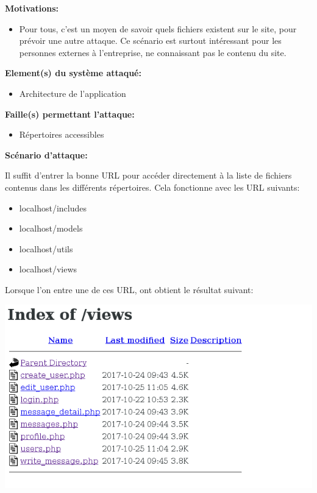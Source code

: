 \documentclass{article}
\begin{document}
\textbf{Motivations:}

\begin{itemize}

\item
  Pour tous, c'est un moyen de savoir quels fichiers existent sur le
  site, pour prévoir une autre attaque. Ce scénario est surtout
  intéressant pour les personnes externes à l'entreprise, ne connaissant
  pas le contenu du site.
\end{itemize}

\textbf{Element(s) du système attaqué:}

\begin{itemize}

\item
  Architecture de l'application
\end{itemize}

\textbf{Faille(s) permettant l'attaque:}

\begin{itemize}

\item
  Répertoires accessibles
\end{itemize}

\textbf{Scénario d'attaque:}

Il suffit d'entrer la bonne URL pour accéder directement à la liste de
fichiers contenus dans les différents répertoires. Cela fonctionne avec
les URL suivants:

\begin{itemize}

\item
  localhost/includes
\item
  localhost/models
\item
  localhost/utils
\item
  localhost/views
\end{itemize}

Lorsque l'on entre une de ces URL, ont obtient le résultat suivant:

\includegraphics[width=\textwidth]{images/repertoire.png}
\end{document}
